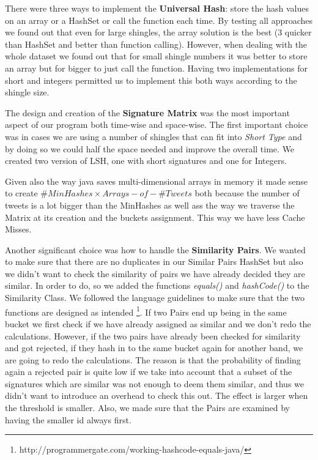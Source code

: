 \documentclass[12pt]{article}
\begin{document}
There were three ways to implement the \textbf{Universal Hash}: store the hash values on an array or a HashSet or call the function each time. By testing all approaches we found out that even for large shingles, the array solution is the best (3 quicker than HashSet and better than function calling). However, when dealing with the whole dataset we found out that for small shingle numbers it was better to store an array but for bigger to just call the function. Having two implementations for short and integers permitted us to implement this both ways according to the shingle size. 

The design and creation of the \textbf{Signature Matrix} was the most important aspect of our program both time-wise and space-wise. The first important choice was in cases we are using a number of shingles that can fit into \textit{Short Type} and by doing so we could half the space needed and improve the overall time. We created two version of LSH, one with short signatures and one for Integers.

Given also the way java saves multi-dimensional arrays in memory it made sense to create $\#MinHashes \times Arrays-of-\#Tweets$ both because the number of tweets is a lot bigger than the MinHashes as well ass the way we traverse the Matrix at its creation and the buckets assignment. This way we have less Cache Misses.

Another significant choice was how to handle the \textbf{Similarity Pairs}. We wanted to make sure that there are no duplicates in our Similar Pairs HashSet but also we didn't want to check the similarity of pairs we have already decided they are similar. In order to do, so we added the functions \textit{equals()} and \textit{hashCode()} to the Similarity Class. We followed the language guidelines to make sure that the two functions are designed as intended \footnote{http://programmergate.com/working-hashcode-equals-java/}. If two Pairs end up being in the same bucket we first check if we have already assigned as similar and we don't redo the calculations. However, if the two pairs have already been checked for similarity and got rejected, if they hash in to the same bucket again for another band, we are going to redo the calculations. The reason is that the probability of finding again a rejected pair is quite low if we take into account that a subset of the signatures which are similar was not enough to deem them similar, and thus we didn't want to introduce an overhead to check this out. The effect is larger when the threshold is smaller. Also, we made sure that the Pairs are examined by having the smaller id always first.
\end{document}
